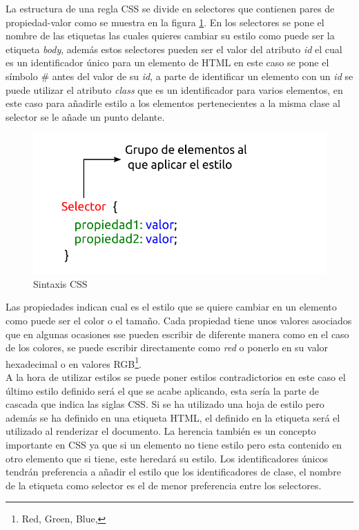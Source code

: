 La estructura de una regla CSS se divide en selectores que contienen pares de propiedad-valor como se muestra en la figura \ref{fig:css}. En los selectores se pone el nombre de las etiquetas las cuales quieres cambiar su estilo como puede ser la etiqueta \textit{body}, además estos selectores pueden ser el valor del atributo \textit{id} el cual es un identificador único para un elemento de HTML en este caso se pone el símbolo # antes del valor de su \textit{id}, a parte de identificar un elemento con un \textit{id} se puede utilizar el atributo \textit{class }que es un identificador para varios elementos, en este caso para añadirle estilo a los elementos pertenecientes a la misma clase al selector se le añade un punto delante.

\begin{figure}[H]
    \centering
    \includegraphics[width=12cm, keepaspectratio]{img/css.png}
    \caption{Sintaxis CSS}
    \label{fig:css}
\end{figure}
\newpage
Las propiedades indican cual es el estilo que se quiere cambiar en un elemento como puede ser el color o el tamaño. Cada propiedad tiene unos valores asociados que en algunas ocasiones sse pueden escribir de diferente manera como en el caso de los colores, se puede escribir directamente como \textit{red} o ponerlo en su valor hexadecimal o en valores RGB\footnote{ Red, Green, Blue,}.\\

A la hora de utilizar estilos se puede poner estilos contradictorios en este caso el último estilo definido será el que se acabe aplicando, esta sería la parte de cascada que indica las siglas CSS. Si se ha utilizado una hoja de estilo pero además se ha definido en una etiqueta HTML, el definido en la etiqueta será el utilizado al renderizar el documento. La herencia también es un concepto importante en CSS ya que si un elemento no tiene estilo pero esta contenido en otro elemento que si tiene, este heredará su estilo. Los identificadores únicos tendrán preferencia a añadir el estilo que los identificadores de clase, el nombre de la etiqueta como selector es el de menor preferencia entre los selectores.\cite{juan3}


